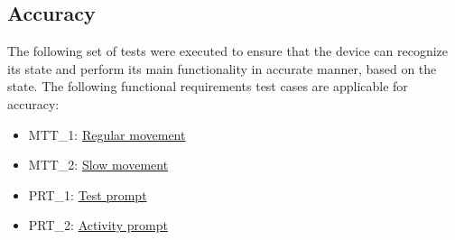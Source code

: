 \documentclass[12pt, titlepage]{article}
\begin{document}
\subsection{Accuracy}
The following set of tests were executed to ensure that the device can recognize its state and perform its main functionality in accurate manner, based on the state.
The following functional requirements test cases are applicable for accuracy:

\begin{itemize}
  \item MTT\_1: \hyperref[MTT1]{Regular movement}
  \item MTT\_2: \hyperref[MTT2]{Slow movement}
  \item PRT\_1: \hyperref[PRT1]{Test prompt}
  \item PRT\_2: \hyperref[PRT2]{Activity prompt}
\end{itemize}
\end{document}
